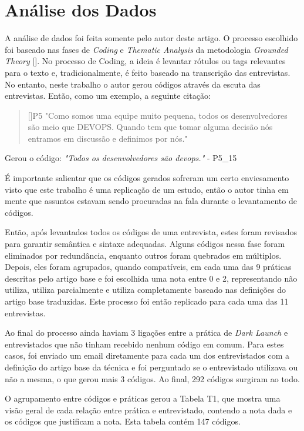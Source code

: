 \section{Análise dos Dados}


A análise de dados foi feita somente pelo autor deste artigo. O processo escolhido foi baseado nas fases de \emph{Coding} e \emph{Thematic Analysis} da metodologia \emph{Grounded Theory} []. No processo de Coding, a ideia é levantar rótulos ou tags relevantes para o texto e, tradicionalmente, é feito baseado na transcrição das entrevistas. No entanto, neste trabalho o autor gerou códigos através da escuta das entrevistas. Então, como um exemplo, a seguinte citação:

\begin{quotation}[]{P5}
"Como somos uma equipe muito pequena, todos os desenvolvedores são meio que DEVOPS. Quando tem que tomar alguma decisão nós entramos em discussão e definimos por nós."
\end{quotation}

Gerou o código: \emph{"Todos os desenvolvedores são devops."} - P5\_15

É importante salientar que os códigos gerados sofreram um certo enviesamento visto que este trabalho é uma replicação de um estudo, então o autor tinha em mente que assuntos estavam sendo procuradas na fala durante o levantamento de códigos. 

Então, após levantados todos os códigos de uma entrevista, estes foram revisados para garantir semântica e sintaxe adequadas. Alguns códigos nessa fase foram eliminados por redundância, enquanto outros foram quebrados em múltiplos. Depois, eles foram agrupados, quando compatíveis, em cada uma das 9 práticas descritas pelo artigo base e foi escolhida uma nota entre 0 e 2, representando não utiliza, utiliza parcialmente e utiliza completamente baseado nas definições do artigo base traduzidas. Este processo foi então replicado para cada uma das 11 entrevistas.

Ao final do processo ainda haviam 3 ligações entre a prática de \emph{Dark Launch} e entrevistados que não tinham recebido nenhum código em comum. Para estes casos, foi enviado um email diretamente para cada um dos entrevistados com a definição do artigo base da técnica e foi perguntado se o entrevistado utilizava ou não a mesma, o que gerou mais 3 códigos. Ao final, 292 códigos surgiram ao todo.

O agrupamento entre códigos e práticas gerou a Tabela T1, que mostra uma visão geral de cada relação entre prática e entrevistado, contendo a nota dada e os códigos que justificam a nota. Esta tabela contém 147 códigos.

